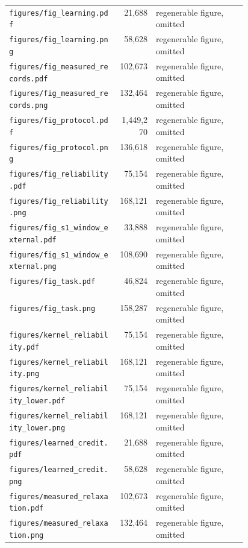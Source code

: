 \documentclass[a4paper,10pt]{article}
\begin{document}
\begin{longtable}{@{}p{0.46\linewidth} r l@{}}
\texttt{\scriptsize figures/fig\_learning.pdf} & 21,688 & regenerable figure, omitted \\
\texttt{\scriptsize figures/fig\_learning.png} & 58,628 & regenerable figure, omitted \\
\texttt{\scriptsize figures/fig\_measured\_records.pdf} & 102,673 & regenerable figure, omitted \\
\texttt{\scriptsize figures/fig\_measured\_records.png} & 132,464 & regenerable figure, omitted \\
\texttt{\scriptsize figures/fig\_protocol.pdf} & 1,449,270 & regenerable figure, omitted \\
\texttt{\scriptsize figures/fig\_protocol.png} & 136,618 & regenerable figure, omitted \\
\texttt{\scriptsize figures/fig\_reliability.pdf} & 75,154 & regenerable figure, omitted \\
\texttt{\scriptsize figures/fig\_reliability.png} & 168,121 & regenerable figure, omitted \\
\texttt{\scriptsize figures/fig\_s1\_window\_external.pdf} & 33,888 & regenerable figure, omitted \\
\texttt{\scriptsize figures/fig\_s1\_window\_external.png} & 108,690 & regenerable figure, omitted \\
\texttt{\scriptsize figures/fig\_task.pdf} & 46,824 & regenerable figure, omitted \\
\texttt{\scriptsize figures/fig\_task.png} & 158,287 & regenerable figure, omitted \\
\texttt{\scriptsize figures/kernel\_reliability.pdf} & 75,154 & regenerable figure, omitted \\
\texttt{\scriptsize figures/kernel\_reliability.png} & 168,121 & regenerable figure, omitted \\
\texttt{\scriptsize figures/kernel\_reliability\_lower.pdf} & 75,154 & regenerable figure, omitted \\
\texttt{\scriptsize figures/kernel\_reliability\_lower.png} & 168,121 & regenerable figure, omitted \\
\texttt{\scriptsize figures/learned\_credit.pdf} & 21,688 & regenerable figure, omitted \\
\texttt{\scriptsize figures/learned\_credit.png} & 58,628 & regenerable figure, omitted \\
\texttt{\scriptsize figures/measured\_relaxation.pdf} & 102,673 & regenerable figure, omitted \\
\texttt{\scriptsize figures/measured\_relaxation.png} & 132,464 & regenerable figure, omitted \\

\end{longtable}
\end{document}
